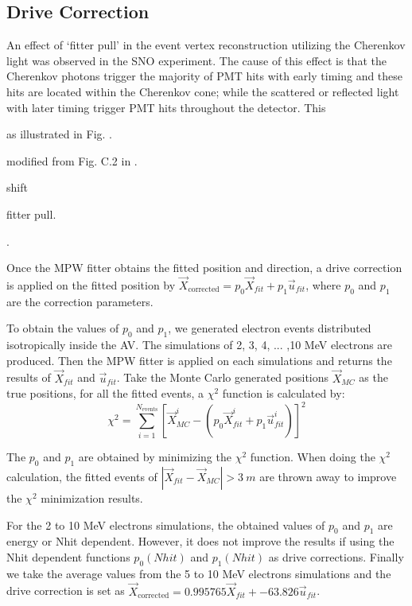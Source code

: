 \subsection{Drive Correction}

An effect of `fitter pull' in the event vertex reconstruction utilizing the Cherenkov light was observed in the SNO experiment. The cause of this effect is that the Cherenkov photons trigger the majority of PMT hits with early timing and these hits are located within the Cherenkov cone; while the scattered or reflected light with later timing trigger PMT hits throughout the detector. This 


 as illustrated in Fig. .

  
  modified from Fig. C.2 in \cite{brice1996monte}.

shift 

fitter pull.



\cite{brice1996monte,coulter2013modelling}.


Once the MPW fitter obtains the fitted position and direction, a drive correction is applied on the fitted position by $\vec{X}_{\mathrm{corrected}} = p_0\vec{X}_{fit}+p_1\vec{u}_{fit}$, where $p_0$ and $p_1$ are the correction parameters.


To obtain the values of $p_0$ and $p_1$, we generated electron events distributed isotropically inside the AV. The simulations of 2, 3, 4, ... ,10 MeV electrons are produced. Then the MPW fitter is applied on each simulations and returns the results of $\vec{X}_{fit}$ and $\vec{u}_{fit}$. Take the Monte Carlo generated positions $\vec{X}_{MC}$ as the true positions, for all the fitted events, a $\chi^2$ function is calculated by:
\[
\chi^2 = \sum_{i=1}^{N_{\mathrm{events}}}[\vec{X}^i_{MC}-(p_0\vec{X}^i_{fit}+p_1\vec{u}^i_{fit})]^2
\]

The $p_0$ and $p_1$ are obtained by minimizing the $\chi^2$ function. 
When doing the $\chi^2$ calculation, the fitted events of $|\vec{X}_{fit}-\vec{X}_{MC}|>3~m$ are thrown away to improve the $\chi^2$ minimization results.

For the 2 to 10 MeV electrons simulations, the obtained values of $p_0$ and $p_1$ are energy or Nhit dependent. However, it does not improve the results if using the Nhit dependent functions $p_0(Nhit)$ and $p_1(Nhit)$ as drive corrections.
Finally we take the average values from the 5 to 10 MeV electrons simulations and the drive correction is set as $\vec{X}_{\mathrm{corrected}} = 0.995765\vec{X}_{fit}+-63.826\vec{u}_{fit}$.

